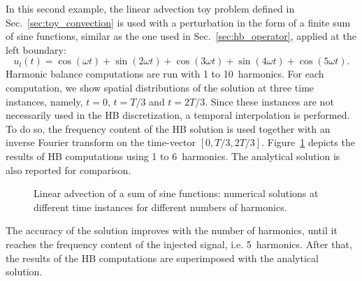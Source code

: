 
In this second example, the linear advection toy problem 
defined in Sec.~\ref{sec:toy_convection} is used with
a perturbation 
in the form of a finite sum of sine functions, similar as the one used
in Sec.~\ref{sec:hb_operator},
applied at the left boundary:
\begin{equation}
    u_l(t) = \cos(\omega t) + \sin(2 \omega t) +
    \cos(3 \omega t) + \sin(4 \omega t) + \cos(5 \omega t).
    \label{eq:sum_injected_fct}
\end{equation}
Harmonic balance computations are run with 1 to 10~harmonics.
For each computation, we show spatial distributions of the solution
at three time instances, namely, $t=0$, $t=T/3$ and $t=2T/3$.
Since these instances are not necessarily used in the HB discretization,
a temporal interpolation is performed.
To do so, the frequency content of the HB solution is used
together with an inverse Fourier transform on the time-vector
$[0, T/3, 2T/3]$.
Figure~\ref{fig:inj_sine_results} depicts the results of HB computations
using 1 to 6~harmonics. The analytical solution is also reported for comparison.

\begin{figure}[htb]
  \centering
  \caption{Linear advection of a sum of sine functions: 
  numerical solutions at different time instances for different numbers of harmonics.}
  \label{fig:inj_sine_results}
\end{figure}

The accuracy of the solution 
improves with the number of harmonics,
until it reaches the frequency content
of the injected signal, i.e. 5~harmonics.
After that, the results of the HB computations are
superimposed with the analytical solution. 

